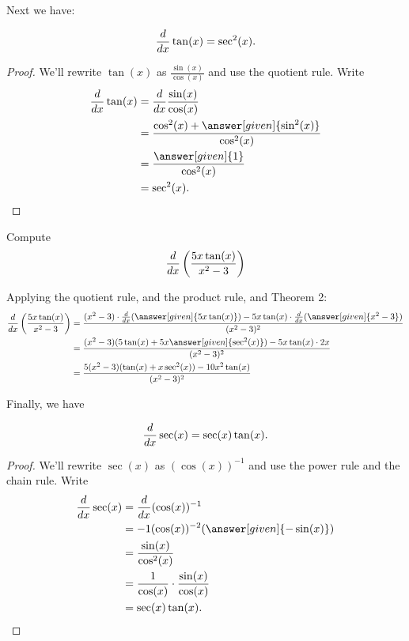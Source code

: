 \documentclass{ximera}
\begin{document}
Next we have:

\begin{theorem}
\[
\frac{d}{dx} \tan(x) = \sec^2(x).
\]

\begin{proof}
We'll rewrite $\tan(x)$ as $\frac{\sin(x)}{\cos(x)}$ and use the quotient rule. Write
\begin{align*}
\ddx\tan(x) &= \ddx\frac{\sin(x)}{\cos(x)}\\
&=\frac{\cos^2(x) + \answer[given]{\sin^2(x)}}{\cos^2(x)}\\
&=\frac{\answer[given]{1}}{\cos^2(x)}\\
&=\sec^2(x).
\end{align*}
\end{proof}
\end{theorem}

\begin{example}
Compute
\[
\frac{d}{dx} \left( \frac{5x \tan(x)}{x^2 - 3} \right)
\]
\begin{explanation}
Applying the quotient rule, and the product rule, and Theorem 2:
\begin{align*}
\ddx \left( \frac{5x \tan(x)}{x^2 - 3} \right) &= \frac{(x^2 - 3) \cdot \ddx(\answer[given]{5x \tan(x)}) - 5x \tan(x) \cdot \ddx (\answer[given]{x^2 - 3})}{(x^2 - 3)^2}  \\
&= \frac{(x^2 - 3)(5 \tan(x) + 5x \answer[given]{\sec^2(x)}) - 5x \tan(x) \cdot 2x}{(x^2 - 3)^2}  \\
&= \frac{5(x^2-3)(\tan(x)+x \sec^2(x)) - 10x^2 \tan(x)}{(x^2-3)^2}
\end{align*}
\end{explanation}
\end{example}

Finally, we have

\begin{theorem}
\[
\frac{d}{dx} \sec(x) = \sec(x)\tan(x).
\]


\begin{proof}
We'll rewrite $\sec(x)$ as $(\cos(x))^{-1}$ and use the power rule and the chain rule. Write
\begin{align*}
\ddx \sec(x) &= \ddx(\cos (x))^{-1}\\
&=-1(\cos(x))^{-2}(\answer[given]{-\sin(x)}) \\
&= \frac{\sin(x)}{\cos^2(x)} \\
&= \frac{1}{\cos(x)} \cdot \frac{\sin(x)}{\cos(x)}  \\
&= \sec(x)\tan(x).
\end{align*}
\end{proof}
\end{theorem}
\end{document}
